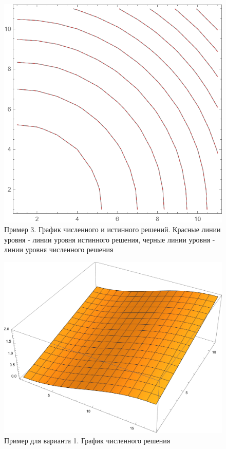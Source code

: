 \documentclass{article}
\begin{document}
	\begin{figure}[H]
        \centering
        \includegraphics[width=\textwidth]{test3.png}
        \caption{Пример 3. График численного и истинного решений.
		 Красные линии уровня - линии уровня истинного решения, черные линии уровня - 
		 линии уровня численного решения}
    \end{figure}
		\begin{figure}[H]
        \centering
        \includegraphics[width=\textwidth]{var1_2.png}
        \caption{Пример для варианта 1. График численного решения}
    \end{figure}
\end{document}
